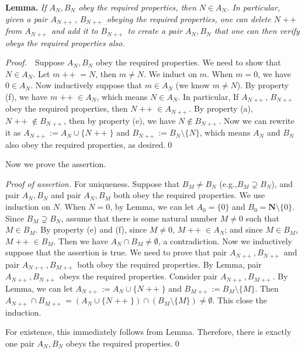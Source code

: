 \documentclass{book}
\DeclareMathOperator{\tadd}{+\!+}%
\newcommand{\pff}{\vspace{.25em}\noindent\emph{Proof.}~~}
\begin{document}
\begin{framed}
    \noindent\textbf{Lemma.} \emph{If $A_N,B_N$ obey the required properties, then $N\in A_N$. In particular, given a pair $A_{N\tadd}$, $B_{N\tadd}$ obeying the required properties, one can delete $N\tadd$ from $A_{N\tadd}$ and add it to $B_{N\tadd}$ to create a pair $A_N,B_N$ that one can then verify obeys the required properties also.}
\end{framed}

\pff Suppose $A_N,B_N$ obey the required properties. We need to show that $N\in A_N$. Let $m\tadd=N$, then $m\neq N$. We induct on $m$. When $m=0$, we have $0\in A_N$. Now inductively suppose that $m\in A_N$ (we know $m\neq N$). By property (f), we have $m\tadd\in A_N$, which means $N\in A_N$. In particular, If $A_{N\tadd}$, $B_{N\tadd}$ obey the required properties, then $N\tadd\in A_{N\tadd}$. By property (a), $N\tadd\notin B_{N\tadd}$, then by property (e), we have $N\notin B_{N\tadd}$. Now we can rewrite it as $A_{N\tadd}:=A_{N}\cup\{N\tadd\}$ and $B_{N\tadd}:=B_{N}\setminus\{N\}$, which means $A_N$ and $B_N$ also obey the required properties, as desired.\qed

Now we prove the assertion.

\noindent\emph{Proof of assertion.} For uniqueness. Suppose that $B_M\neq B_N$ (e.g.,$B_M\supsetneq B_N$), and pair $A_N, B_N$ and pair $A_N, B_M$ both obey the required properties. We use induction on $N$. When $N=0$, by Lemma, we can let $A_0=\{0\}$ and $B_{0}=\mathbf{N}\setminus\{0\}$. Since $B_M\supsetneq B_N$, assume that there is some natural number $M\neq 0$ such that $M\in B_M$. By property (e) and (f), since $M\neq 0$, $M\tadd\in A_N$; and since $M\in B_M$, $M\tadd\in B_M$. Then we have $A_N\cap B_M\neq\emptyset$, a contradiction. Now we inductively suppose that the assertion is true. We need to prove that pair $A_{N\tadd}, B_{N\tadd}$ and pair $A_{N\tadd}, B_{M\tadd}$ both obey the required properties. By Lemma, pair $A_{N\tadd}, B_{N\tadd}$ obeys the required properties. Consider pair $A_{N\tadd}, B_{M\tadd}$. By Lemma, we can let $A_{N\tadd}:=A_{N}\cup\{N\tadd\}$ and $B_{M\tadd}:=B_{M}\setminus\{M\}$. Then $A_{N\tadd}\cap B_{M\tadd}=(A_{N}\cup\{N\tadd\})\cap(B_{M}\setminus\{M\})\neq\emptyset$. This close the induction. 

For existence, this immediately follows from Lemma. Therefore, there is exactly one pair $A_N,B_N$ obeys the required properties.\qed

\end{document}
